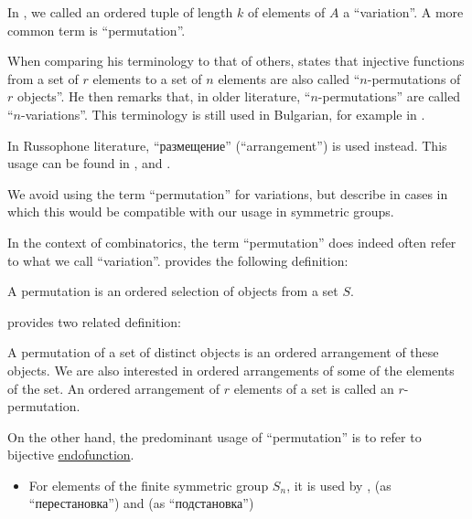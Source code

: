 \begin{remark}\label{rem:combinatorial_permutation_terminology}
  In , we called an ordered tuple of length \( k \) of elements of \( A \) a \enquote{variation}. A more common term is \enquote{permutation}.

  When comparing his terminology to that of others,  states that injective functions from a set of \( r \) elements to a set of \( n \) elements are also called \enquote{\( n \)-permutations of \( r \) objects}. He then remarks that, in older literature, \enquote{\( n \)-permutations} are called \enquote{\( n \)-variations}. This terminology is still used in Bulgarian, for example in \cite[27]{ДимитровЯнев2007Статистика}.

  In Russophone literature, \enquote{размещение} (\enquote{arrangement}) is used instead. This usage can be found in ,  and .

  We avoid using the term \enquote{permutation} for variations, but describe in  cases in which this would be compatible with our usage in symmetric groups.

  In the context of combinatorics, the term \enquote{permutation} does indeed often refer to what we call \enquote{variation}.  provides the following definition:
  \begin{displayquote}
    A permutation is an ordered selection of objects from a set \( S \).
  \end{displayquote}

   provides two related definition:
  \begin{displayquote}
    A permutation of a set of distinct objects is an ordered arrangement of these objects. We are also interested in ordered arrangements of some of the elements of the set. An ordered arrangement of \( r \) elements of a set is called an \( r \)-permutation.
  \end{displayquote}

  On the other hand, the predominant usage of \enquote{permutation} is to refer to bijective \hyperref[def:function/endofunction]{endofunction}.
  \begin{itemize}
    \item For elements of the finite symmetric group \( S_n \), it is used by
    ,
     (as \enquote{перестановка}) and
     (as \enquote{подстановка})


\end{itemize}
\end{remark}
